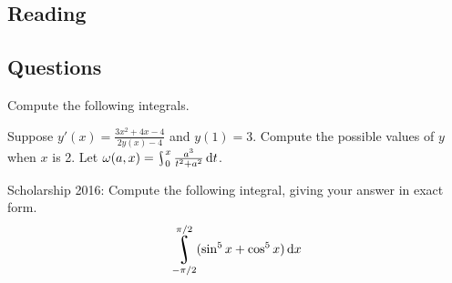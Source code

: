 


\subsection*{Reading}


\subsection*{Questions}
\begin{questions}
  \question Compute the following integrals.
  \question Suppose $ y'(x) = \frac{3x^2 + 4x - 4}{2y(x) - 4} $ and $ y(1) = 3 $. Compute the possible values of $ y $ when $ x $ is 2.
  \question Let $ \omega(a, x) = \rint^x_0 \frac{a^3}{t^2 + a^2} \dif{t} $.
  \question Scholarship 2016: Compute the following integral, giving your answer in exact form.
    \begin{displaymath}
      \rint_{-\pi/2}^{\pi/2} (\sin^5 x + \cos^5 x) \dif{x}
    \end{displaymath}
\end{questions}


